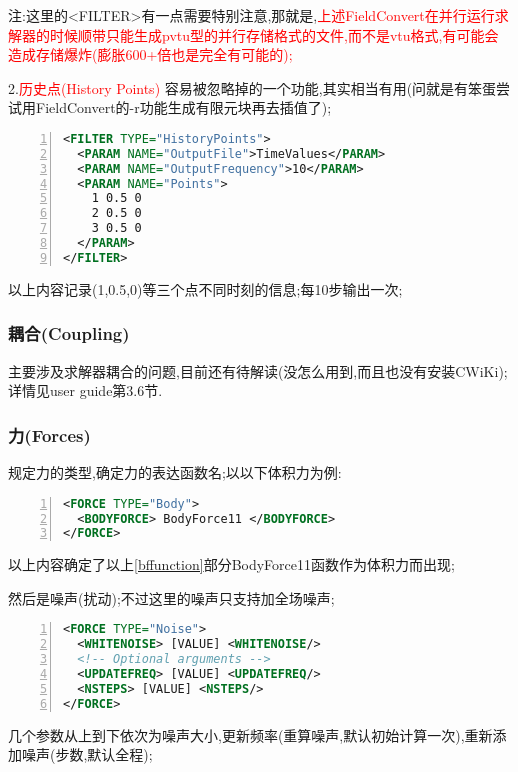 注:这里的<FILTER>有一点需要特别注意,那就是,\textcolor{red}{上述FieldConvert在并行运行求解器的时候顺带只能生成pvtu型的并行存储格式的文件,而不是vtu格式,有可能会造成存储爆炸(膨胀600+倍也是完全有可能的);}

2.\textcolor{red}{历史点(History Points)}
容易被忽略掉的一个功能,其实相当有用(问就是有笨蛋尝试用FieldConvert的-r功能生成有限元块再去插值了);
\begin{lstlisting}[frame=single,numbers=left,language=XML]
<FILTER TYPE="HistoryPoints">
  <PARAM NAME="OutputFile">TimeValues</PARAM>
  <PARAM NAME="OutputFrequency">10</PARAM>
  <PARAM NAME="Points">
    1 0.5 0
    2 0.5 0
    3 0.5 0
  </PARAM>
</FILTER>
\end{lstlisting}
\par
以上内容记录(1,0.5,0)等三个点不同时刻的信息;每10步输出一次;

\subsubsection{耦合(Coupling)}
主要涉及求解器耦合的问题,目前还有待解读(没怎么用到,而且也没有安装CWiKi);详情见user guide第3.6节.

\subsubsection{力(Forces)}
规定力的类型,确定力的表达函数名;以以下体积力为例:\par
\begin{lstlisting}[frame=single,numbers=left,language=XML]
<FORCE TYPE="Body">
  <BODYFORCE> BodyForce11 </BODYFORCE>
</FORCE>
\end{lstlisting}
\par
以上内容确定了以上\ref{bffunction}部分BodyForce11函数作为体积力而出现;\par

然后是噪声(扰动);不过这里的噪声只支持加全场噪声;
\begin{lstlisting}[frame=single,numbers=left,language=XML]
<FORCE TYPE="Noise">
  <WHITENOISE> [VALUE] <WHITENOISE/>
  <!-- Optional arguments -->
  <UPDATEFREQ> [VALUE] <UPDATEFREQ/>
  <NSTEPS> [VALUE] <NSTEPS/>
</FORCE>
\end{lstlisting}
\par
几个参数从上到下依次为噪声大小,更新频率(重算噪声,默认初始计算一次),重新添加噪声(步数,默认全程);\par


